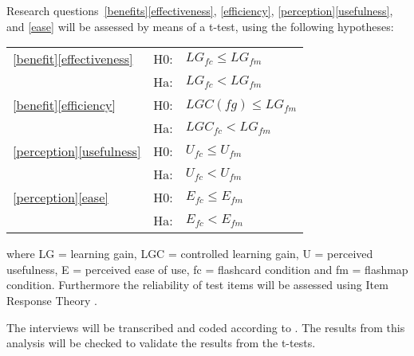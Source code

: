 
Research questions~\ref{benefits}\ref{effectiveness}, \ref{efficiency}, \ref{perception}\ref{usefulness}, and \ref{ease} will be assessed by means of a t-test, using the following hypotheses: 
\begin{tabular}{l l l}
\ref{benefit}\ref{effectiveness} & H0: & $LG_{fc} \leq LG_{fm}$ \\
                                 & Ha: & $LG_{fc} < LG_{fm}$ \\
\ref{benefit}\ref{efficiency}    & H0: & $LGC(fg) \leq LG_{fm}$ \\
                                 & Ha: & $ LGC_{fc} < LG_{fm}$ \\
\ref{perception}\ref{usefulness} & H0: & $U_{fc} \leq U_{fm}$ \\
                                 & Ha: & $U_{fc} < U_{fm}$ \\
\ref{perception}\ref{ease}       & H0: & $E_{fc} \leq E_{fm}$ \\
                                 & Ha: & $E_{fc} < E_{fm}$ \\
\end{tabular}
where LG = learning gain, LGC = controlled learning gain, U = perceived usefulness, E = perceived ease of use, fc = flashcard condition and fm = flashmap condition. Furthermore the reliability of test items will be assessed using Item Response Theory \cite{irt}.

The interviews will be transcribed and coded according to . The results from this analysis will be checked to validate the results from the t-tests. 

